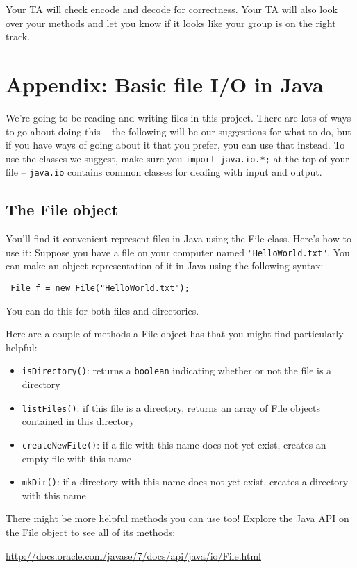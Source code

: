 \documentclass[11pt]{article}
\begin{document}
Your TA will check encode and decode for correctness. Your TA will also look over your methods and let you know if it looks like your group is on the right track.

\newpage
\section*{Appendix: Basic file I/O in Java}

We're going to be reading and writing files in this project. There are lots of ways to go about doing this -- the following will be our suggestions for what to do, but if you have ways of going about it that you prefer, you can use that instead. To use the classes we suggest, make sure you \texttt{import java.io.*;} at the top of your file -- \texttt{java.io} contains common classes for dealing with input and output.

\subsection*{The File object}

You'll find it convenient represent files in Java using the File class. Here's how to use it: Suppose you have a file on your computer named \texttt{"HelloWorld.txt"}. You can make an object representation of it in Java using the following syntax:
\begin{center}
\texttt{
    File f = new File("HelloWorld.txt");
}
\end{center}

You can do this for both files and directories.

Here are a couple of methods a File object has that you might find particularly helpful:

\begin{itemize}
\item \texttt{isDirectory()}: returns a \texttt{boolean} indicating whether or not the file is a directory
\item \texttt{listFiles()}: if this file is a directory, returns an array of File objects contained in this directory
\item \texttt{createNewFile()}: if a file with this name does not yet exist, creates an empty file with this name
\item \texttt{mkDir()}: if a directory with this name does not yet exist, creates a directory with this name
\end{itemize}

There might be more helpful methods you can use too! Explore the Java API on the File object to see all of its methods:
\begin{center}
    {\color{blue}\href{http://docs.oracle.com/javase/7/docs/api/java/io/File.html}{http://docs.oracle.com/javase/7/docs/api/java/io/File.html}}
\end{center}
\end{document}
